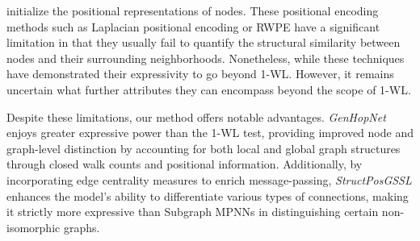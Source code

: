 initialize the positional representations of nodes. These positional encoding methods such as Laplacian positional encoding \cite{dwivedi2020generalization} or RWPE \cite{dwivedi2021graph} have a significant limitation in that they usually fail to quantify the structural similarity between nodes and their surrounding neighborhoods. Nonetheless, while these techniques have demonstrated their expressivity to go beyond 1-WL. However, it remains uncertain what further attributes they can encompass beyond the scope of 1-WL. 

Despite these limitations, our method offers notable advantages. \emph{GenHopNet} enjoys greater expressive power than the 1-WL test, providing improved node and graph-level distinction by accounting for both local and global graph structures through closed walk counts and positional information. Additionally, by incorporating edge centrality measures to enrich message-passing, \emph{StructPosGSSL} enhances the model's ability to differentiate various types of connections, making it strictly more expressive than Subgraph MPNNs \cite{you2021identity, cotta2021reconstruction, zhang2021nested} in distinguishing certain non-isomorphic graphs.

